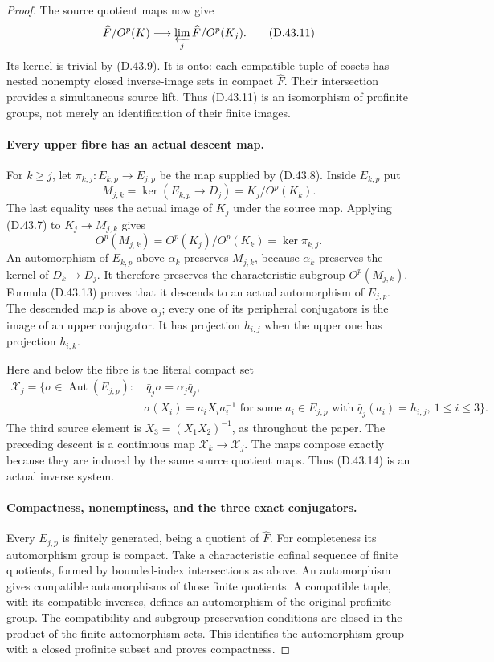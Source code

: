 \begin{proof}
The source quotient maps now give
\[
 \widehat F/O^p(K)\longrightarrow
                  \varprojlim_j\widehat F/O^p(K_j).
 \tag{D.43.11}
\]
Its kernel is trivial by
\textup{(D.43.9)}.
It is onto: each compatible tuple of
cosets has nested nonempty closed
inverse-image sets in compact
\(\widehat F\).
Their intersection provides a
simultaneous source lift.
Thus \textup{(D.43.11)} is an
isomorphism of profinite groups,
not merely an identification of
their finite images.

\paragraph{Every upper fibre has an actual descent map.}
For \(k\geq j\), let
\(\pi_{k,j}:E_{k,p}\to E_{j,p}\)
be the map supplied by
\textup{(D.43.8)}.
Inside \(E_{k,p}\) put
\[
 M_{j,k}
   =\ker(E_{k,p}\longrightarrow D_j)
   =K_j/O^p(K_k).
 \tag{D.43.12}
\]
The last equality uses the actual
image of \(K_j\) under the source map.
Applying \textup{(D.43.7)} to
\(K_j\twoheadrightarrow M_{j,k}\)
gives
\[
 O^p(M_{j,k})
       =O^p(K_j)/O^p(K_k)
       =\ker\pi_{k,j}.
 \tag{D.43.13}
\]
An automorphism of \(E_{k,p}\)
above \(\alpha_k\) preserves
\(M_{j,k}\), because
\(\alpha_k\) preserves the kernel
of \(D_k\to D_j\).
It therefore preserves the
characteristic subgroup
\(O^p(M_{j,k})\).
Formula \textup{(D.43.13)} proves
that it descends to an actual
automorphism of \(E_{j,p}\).
The descended map is above
\(\alpha_j\); every one of its
peripheral conjugators is the
image of an upper conjugator.
It has projection \(h_{i,j}\)
when the upper one has projection
\(h_{i,k}\).

Here and below the fibre is the
literal compact set
\[
 \begin{split}
 \mathscr X_j=\{\sigma\in\operatorname{Aut}(E_{j,p}):&
 \ \bar q_j\sigma=\alpha_j\bar q_j,\ \\
 &\sigma(X_i)=a_iX_i a_i^{-1}
 \text{ for some }a_i\in E_{j,p}
 \text{ with }\bar q_j(a_i)=h_{i,j},
 \ 1\leq i\leq3\}.
 \end{split}
 \tag{D.43.14}
\]
The third source element is
\(X_3=(X_1X_2)^{-1}\), as throughout
the paper.
The preceding descent is a
continuous map
\(\mathscr X_k\to\mathscr X_j\).
The maps compose exactly because
they are induced by the same
source quotient maps.
Thus \textup{(D.43.14)} is an
actual inverse system.

\paragraph{Compactness, nonemptiness, and the three exact conjugators.}
Every \(E_{j,p}\) is finitely
generated, being a quotient of
\(\widehat F\).
For completeness its automorphism
group is compact.
Take a characteristic cofinal
sequence of finite quotients,
formed by bounded-index
intersections as above.
An automorphism gives compatible
automorphisms of those finite
quotients.
A compatible tuple, with its
compatible inverses, defines
an automorphism of the original
profinite group.
The compatibility and subgroup
preservation conditions are
closed in the product of the
finite automorphism sets.
This identifies the automorphism
group with a closed profinite
subset and proves compactness.


\end{proof}
